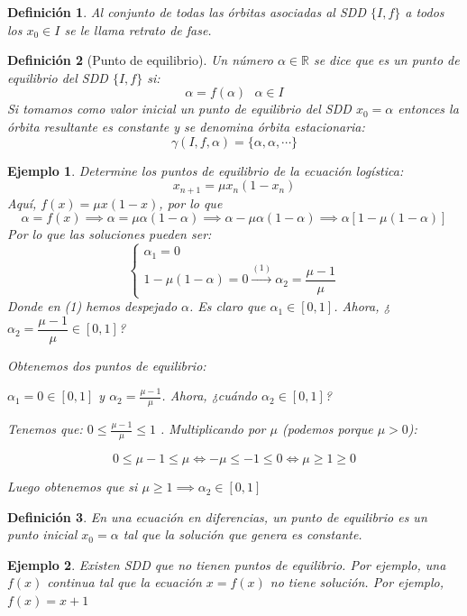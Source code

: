 \documentclass[11pt, a4paper, titlepage]{article}
\newcommand{\R}{\mathbb{R}}
\theoremstyle{theorem-style}
\theoremstyle{definition-style}
\newtheorem*{ndef}{Definición}
\theoremstyle{remark-style}
\theoremstyle{example-style}
\newtheorem*{ejemplo}{Ejemplo}
\begin{document}
\begin{ndef}
	Al conjunto de todas las órbitas asociadas al SDD $\{I,f\}$  a todos los $x_0 \in I$ se le llama retrato de fase.
\end{ndef}

\begin{ndef}[Punto de equilibrio]
	Un número $\alpha \in \R$ se dice que es un punto de equilibrio del SDD $\{I,f\}$ si:
	\[
	\alpha = f(\alpha) \ \ \ \alpha \in I
	\]
	Si tomamos como valor inicial un punto de equilibrio del SDD $x_0 = \alpha$ entonces la órbita resultante es constante y se denomina órbita estacionaria:
	\[
	\gamma(I,f,\alpha) = \{\alpha, \alpha, \cdots\}
	\]
\end{ndef}
\begin{ejemplo}
	Determine los puntos de equilibrio de la ecuación logística:
	\[
	x_{n+1} = \mu x_n(1-x_n)
	\]
	Aquí, $f(x) = \mu x(1-x)$, por lo que
	 \[
	\alpha = f(x) \implies \alpha = \mu \alpha (1-\alpha) \implies \alpha - \mu \alpha(1-\alpha) \implies \alpha[1-\mu(1-\alpha)]
	\]
	Por lo que las soluciones pueden ser:
	\[
	\begin{cases}
	\alpha_1 = 0\\
	1-\mu(1-\alpha) = 0 \xrightarrow{(1)} \alpha_2 = \dfrac{\mu -1}{\mu}
\end{cases}
	\]
	Donde en (1) hemos despejado $\alpha$. Es claro que $\alpha_1 \in [0,1]$. Ahora, ¿$\alpha_2=  \dfrac{\mu -1}{\mu} \in [0,1] $?
	

	Obtenemos dos puntos de equilibrio:

	$ \alpha_{1} = 0 \in [0,1] $ y $ \alpha_{2}= \frac{\mu - 1}{\mu} $. Ahora, ¿cuándo $\alpha_2\in [0,1] $?

	Tenemos que: $ 0 \leq \frac{\mu - 1}{\mu} \leq 1 $ . Multiplicando por $\mu$ (podemos porque $\mu > 0$):

	$$ 0 \leq \mu - 1 \leq \mu \Leftrightarrow -\mu \leq -1 \leq 0 \Leftrightarrow \mu \geq 1 \geq 0 $$

	Luego obtenemos que si $\mu \geq 1 \implies \alpha_{2} \in [0,1] $

\end{ejemplo}

\begin{ndef}
	En una ecuación en diferencias, un punto de equilibrio es un punto inicial $x_0= \alpha$ tal que la solución que genera es constante.
\end{ndef}

\begin{ejemplo}
	Existen SDD que no tienen puntos de equilibrio. Por ejemplo, una $f(x)$ continua tal que la ecuación $x = f(x)$ no tiene solución. Por ejemplo, $f(x) = x+1$
\end{ejemplo}
\end{document}
